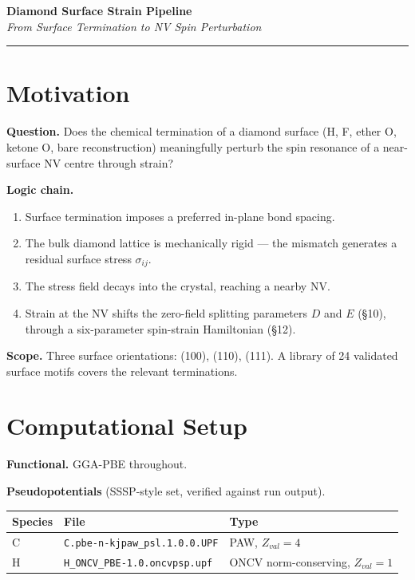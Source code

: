 \documentclass[11pt]{article}
\begin{document}
\begin{center}
{\LARGE\textbf{Diamond Surface Strain Pipeline}}\\[6pt]
{\large\textit{From Surface Termination to NV Spin Perturbation}}
\end{center}
\vspace{2mm}
\noindent\rule{\textwidth}{0.6pt}
\vspace{2mm}

\section{Motivation}

\textbf{Question.} Does the chemical termination of a diamond surface (H, F, ether O, ketone O, bare reconstruction) meaningfully perturb the spin resonance of a near-surface NV centre through strain?

\textbf{Logic chain.}
\begin{enumerate}
  \item Surface termination imposes a preferred in-plane bond spacing.
  \item The bulk diamond lattice is mechanically rigid --- the mismatch generates a residual surface stress $\sigma_{ij}$.
  \item The stress field decays into the crystal, reaching a nearby NV.
  \item Strain at the NV shifts the zero-field splitting parameters $D$ and $E$ (\S10), through a six-parameter spin-strain Hamiltonian (\S12).
\end{enumerate}

\textbf{Scope.} Three surface orientations: (100), (110), (111). A library of 24 validated surface motifs covers the relevant terminations.

\section{Computational Setup}

\textbf{Functional.} GGA-PBE throughout.

\textbf{Pseudopotentials} (SSSP-style set, verified against run output).

\begin{center}
\begin{tabular}{lll}
\toprule
Species & File & Type \\
\midrule
C & \texttt{C.pbe-n-kjpaw\_psl.1.0.0.UPF} & PAW, $Z_{val}=4$ \\
H & \texttt{H\_ONCV\_PBE-1.0.oncvpsp.upf} & ONCV norm-conserving, $Z_{val}=1$ \\
\bottomrule
\end{tabular}
\end{center}
\end{document}
